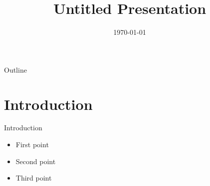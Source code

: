 \documentclass{beamer}
\title{Untitled Presentation}
\author{}
\date{\today}
\begin{document}
\frame{\titlepage}

\begin{frame}{Outline}
  \tableofcontents
\end{frame}

\section{Introduction}
\begin{frame}{Introduction}
  \begin{itemize}
    \item First point
    \item Second point
    \item Third point
  \end{itemize}
\end{frame}
\end{document}

